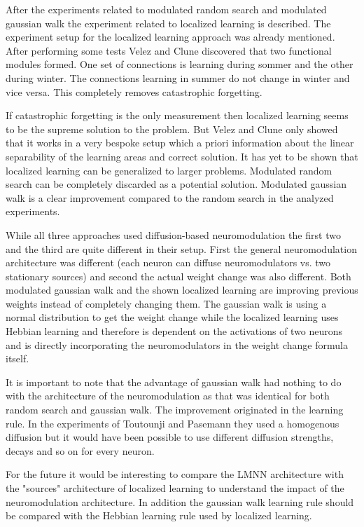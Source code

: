 \documentclass[12pt,twoside]{scrartcl}
\theoremstyle{plain}
\theoremstyle{definition}
\theoremstyle{remark}
\begin{document}
After the experiments related to modulated random search and modulated gaussian
walk the experiment related to localized learning is described.
The experiment setup for the localized learning approach was already mentioned.
After performing some tests Velez and Clune discovered that two functional
modules formed. One set of connections is learning during sommer and the other
during winter. The connections learning in summer do not change in winter and
vice versa. This completely removes catastrophic forgetting.

If catastrophic forgetting is the only measurement then localized learning
seems to be the supreme solution to the problem. But Velez and Clune only
showed that it works in a very bespoke setup which a priori information about
the linear separability of the learning areas and correct solution. It has yet
to be shown that localized learning can be generalized to larger problems.
Modulated random search can be completely discarded as a potential solution.
Modulated gaussian walk is a clear improvement compared to the random search
in the analyzed experiments.

While all three approaches used diffusion-based neuromodulation the first two and
the third are quite different in their setup. First the general neuromodulation
architecture was different (each neuron can diffuse neuromodulators vs. two stationary
sources) and second the actual weight change was also different. Both modulated
gaussian walk and the shown localized learning are improving previous weights
instead of completely changing them. The gaussian walk is using a normal distribution
to get the weight change while the localized learning uses Hebbian learning and
therefore is dependent on the activations of two neurons and is directly incorporating
the neuromodulators in the weight change formula itself.

It is important to note that the advantage of gaussian walk had nothing to do
with the architecture of the neuromodulation as that was identical for both
random search and gaussian walk. The improvement originated in the learning
rule. In the experiments of Toutounji and Pasemann they used a homogenous
diffusion but it would have been possible to use different diffusion strengths,
decays and so on for every neuron.

For the future it would be interesting to
compare the LMNN architecture with the "sources" architecture of localized
learning to understand the impact of the neuromodulation architecture.
In addition the gaussian walk learning rule should be compared with the
Hebbian learning rule used by localized learning.
\end{document}
